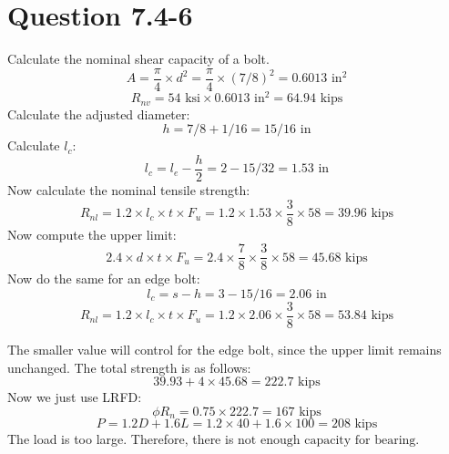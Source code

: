 \documentclass{article}
\begin{document}
\section*{Question 7.4-6}
Calculate the nominal shear capacity of a bolt.
\[A=\frac{\pi}{4}\times d^2=\frac{\pi}{4}\times (7/8)^2 = 0.6013\text{ in}^2\] 
\[R_{nv}=54\text{ ksi}\times 0.6013\text{ in}^2=64.94\text{ kips}\] 
Calculate the adjusted diameter: 
\[h=7/8+1/16=15/16\text{ in}\] 
Calculate $l_c$: 
\[l_c=l_e-\frac{h}{2}=2-15/32=1.53\text{ in}\] 
Now calculate the nominal tensile strength: 
\[R_{nl}=1.2\times l_c\times t\times F_u=1.2\times 1.53\times\frac{3}{8}\times 58=39.96\text{ kips}\]  
Now compute the upper limit: 
\[2.4\times d\times t\times F_u = 2.4\times \frac{7}{8}\times \frac{3}{8}\times 58=45.68\text{ kips}\] 
Now do the same for an edge bolt: 
\[l_c=s-h=3-15/16=2.06\text{ in}\] 
\[R_{nl}=1.2\times l_c\times t\times F_u=1.2\times 2.06\times\frac{3}{8}\times 58=53.84\text{ kips}\]  

The smaller value will control for the edge bolt, since the upper limit remains unchanged. The total strength is as follows: 
\[39.93+4\times 45.68=222.7\text{ kips}\] 
Now we just use LRFD: 
\[\phi R_n=0.75\times 222.7 = 167\text{ kips}\] 
\[P= 1.2D+1.6L=1.2\times 40+1.6\times 100=208\text{ kips}\] 
The load is too large. Therefore, there is $\boxed{\text{not enough capacity for bearing}}$.
\end{document}
